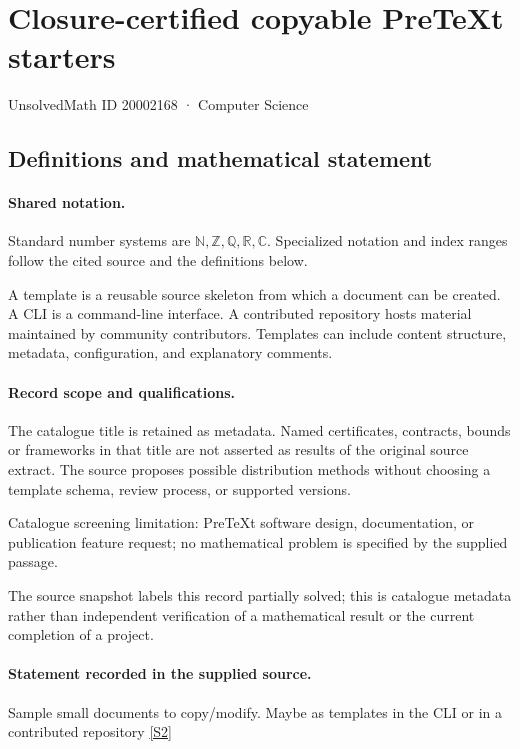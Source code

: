 \documentclass[11pt]{article}
\newcommand{\sref}[2]{\hyperlink{source:#1:#2}{[S#2]}}
\begin{document}
\setcounter{section}{20002167}
\section{Closure-certified copyable PreTeXt starters}\label{20002168}
{\small\sffamily UnsolvedMath ID 20002168 · Computer Science}
\subsection{Definitions and mathematical statement}

\paragraph{Shared notation.}Standard number systems are $\mathbb N,\mathbb Z,\mathbb Q,\mathbb R,\mathbb C$. Specialized notation and index ranges follow the cited source and the definitions below.


A template is a reusable source skeleton from which a document can be created. A CLI is a command-line interface. A contributed repository hosts material maintained by community contributors. Templates can include content structure, metadata, configuration, and explanatory comments.
\paragraph{Record scope and qualifications.}
The catalogue title is retained as metadata. Named certificates, contracts, bounds or frameworks in that title are not asserted as results of the original source extract.
The source proposes possible distribution methods without choosing a template schema, review process, or supported versions.

Catalogue screening limitation: PreTeXt software design, documentation, or publication feature request; no mathematical problem is specified by the supplied passage.

The source snapshot labels this record partially solved; this is catalogue metadata rather than independent verification of a mathematical result or the current completion of a project.
\paragraph{Statement recorded in the supplied source.}
Sample small documents to copy/modify. Maybe as templates in the CLI or in a contributed repository \sref{20002168}{2}
\end{document}
